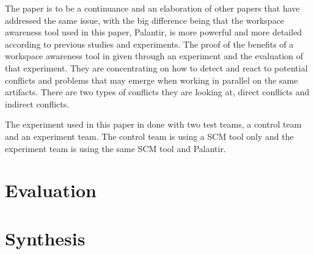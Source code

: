 \documentclass[a4paper]{article}
\begin{document}
The paper is to be a continuance and an elaboration of other papers that have addressed the same issue, with the big difference being that the workspace awareness tool used in this paper, Palantir,  is more powerful and more detailed according to previous studies and experiments.
The proof of the benefits of a workspace awareness tool in given through an experiment and the evaluation of that experiment. They are concentrating on how to detect and react to potential conflicts and problems that may emerge when working in parallel on the same artifacts. There are two types of conflicts they are looking at, direct conflicts and indirect conflicts. \begin{comment}Direct conflicts is when two people is working on the same artifact on different workspaces and their changes to the file needs to be merged to create a combined result. Indirect conflict is for example when person A is changing a file that person B uses as an import in another file. When person A commits and person B updates, person B's file does not work anymore because of the changes made in the imported file that person A was working on.\end{comment}
The experiment used in this paper in done with two test teams, a control team and an experiment team. The control team is using a SCM tool only and the experiment team is using the same SCM tool and Palantir. 
\section*{Evaluation}



\section*{Synthesis}
\end{document}
